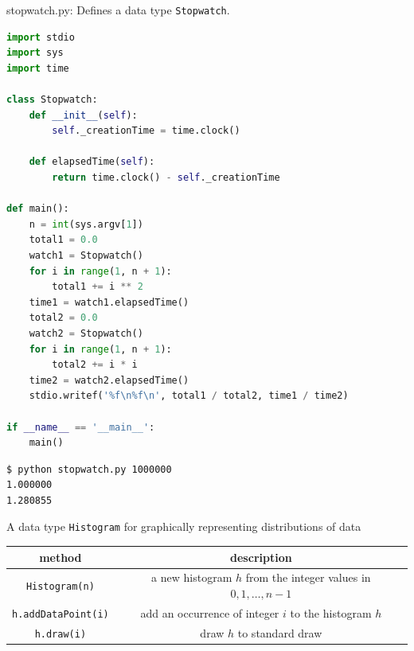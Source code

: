 \documentclass[8pt,a4paper,compress,handout]{beamer}
\begin{document}
\begin{frame}[fragile]
\begin{framed}
\tiny stopwatch.py: Defines a data type \lstinline{Stopwatch}. 
\end{framed}

\begin{lstlisting}[language=Python]
import stdio
import sys
import time

class Stopwatch:
    def __init__(self):
        self._creationTime = time.clock()
    
    def elapsedTime(self):
        return time.clock() - self._creationTime

def main():
    n = int(sys.argv[1])
    total1 = 0.0
    watch1 = Stopwatch()
    for i in range(1, n + 1):
        total1 += i ** 2
    time1 = watch1.elapsedTime()    
    total2 = 0.0
    watch2 = Stopwatch()
    for i in range(1, n + 1):
        total2 += i * i
    time2 = watch2.elapsedTime()    
    stdio.writef('%f\n%f\n', total1 / total2, time1 / time2)

if __name__ == '__main__':
    main()
\end{lstlisting}

\begin{lstlisting}[language={}]
$ python stopwatch.py 1000000
1.000000
1.280855
\end{lstlisting}
\end{frame}

\begin{frame}[fragile]
A data type \lstinline{Histogram} for graphically representing distributions of data
\begin{center}
\begin{tabular}{cc}
method & description \\ \hline
\lstinline$Histogram(n)$ & a new histogram $h$ from the integer values in $0, 1, \dots, n-1$ \\
\lstinline$h.addDataPoint(i)$ & add an occurrence of integer $i$ to the histogram $h$ \\
\lstinline$h.draw(i)$ & draw $h$ to standard draw
\end{tabular} 
\end{center}
\end{frame}
\end{document}
